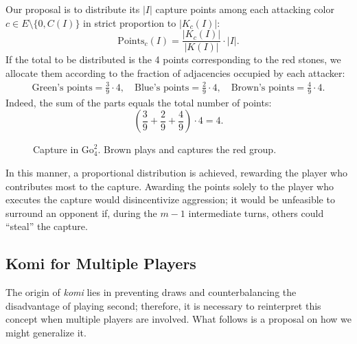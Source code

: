 Our proposal is to distribute its $|I|$ capture points among each attacking color
$c \in E \setminus \{0, C(I)\}$ in strict proportion to $|K_c(I)|$:
\[\text{Points}_c(I) = \frac{|K_c(I)|}{|K(I)|} \cdot |I|.\]
If the total to be distributed is the 4 points corresponding to the red stones, we allocate
them according to the fraction of adjacencies occupied by each attacker:
\begin{align*}
	\text{Green's points} = \frac{3}{9} \cdot 4,\quad
	\text{Blue's points} = \frac{2}{9} \cdot 4,\quad
	\text{Brown's points} = \frac{4}{9} \cdot 4.
\end{align*}
Indeed, the sum of the parts equals the total number of points:
\[ \left(\frac{3}{9} + \frac{2}{9} + \frac{4}{9}\right) \cdot 4 = 4. \]
\begin{figure}[H]
	\centering
\begin{goban}[7, hoshi = false]
\end{goban}
\quad
\begin{goban}[7, hoshi = false]
\end{goban}
	\caption{
		Capture in $\mathrm{Go}^{2}_{4}$. Brown plays and captures the red group.}
	\label{fig:capturasm}
\end{figure}
In this manner, a proportional distribution is achieved, rewarding the player who contributes most to the capture. Awarding the points solely to the player who executes the capture would disincentivize aggression; it would be unfeasible to surround an opponent if, during the $m-1$ intermediate turns, others could ``steal'' the capture.
\subsection{Komi for Multiple Players}\label{komi_n_jug}

The origin of \textit{komi} lies in preventing draws and counterbalancing the disadvantage of playing second; therefore, it is necessary to reinterpret this concept when multiple players are involved. What follows is a proposal on how we might generalize it.

